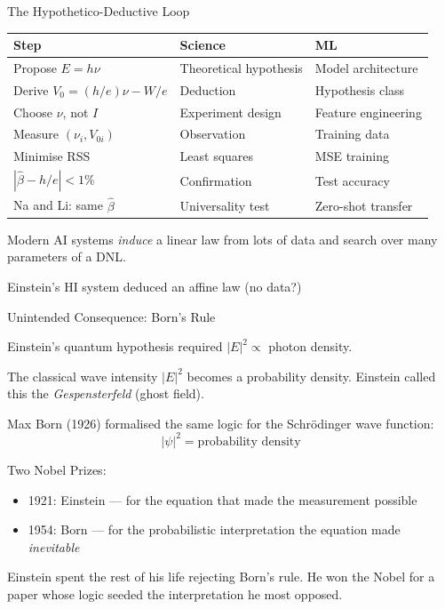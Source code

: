 \documentclass[aspectratio=169]{beamer}
\begin{document}
\begin{frame}{The Hypothetico-Deductive Loop}

\begin{center}
\small
\begin{tabular}{p{4.0cm}p{4.0cm}p{4.0cm}}
\toprule
\textbf{Step} & \textbf{Science} & \textbf{ML} \\
\midrule
Propose $E = h\nu$              & Theoretical hypothesis & Model architecture \\
Derive $V_0 = (h/e)\nu - W/e$   & Deduction              & Hypothesis class \\
Choose $\nu$, not $I$           & Experiment design      & Feature engineering \\
Measure $(\nu_i, V_{0i})$       & Observation            & Training data \\
Minimise RSS                    & Least squares          & MSE training \\
$|\hat\beta - h/e| < 1\%$       & Confirmation           & Test accuracy \\
Na and Li: same $\hat\beta$     & Universality test      & Zero-shot transfer \\
\bottomrule
\end{tabular}
\end{center}

\bigskip
Modern AI systems  \emph{induce} a linear law from lots of data and
search over many parameters of a DNL.

Einstein's HI system  deduced  an affine law (no data?)

\end{frame}

\begin{frame}{Unintended Consequence: Born's Rule}

Einstein's quantum hypothesis required $|E|^2 \propto$ photon density.

The classical wave intensity $|E|^2$ becomes a probability density.
Einstein called this the \emph{Gespensterfeld} (ghost field).

\medskip
Max Born (1926) formalised the same logic for the Schr\"odinger wave
function:
\[
  \boxed{|\psi|^2 = \text{probability density}}
\]

\medskip
Two Nobel Prizes:
\begin{itemize}
  \item 1921: Einstein --- for the equation that made the measurement
    possible
  \item 1954: Born --- for the probabilistic interpretation the equation
    made \emph{inevitable}
\end{itemize}

\medskip
Einstein spent the rest of his life rejecting Born's rule. He won the
Nobel for a paper whose logic seeded the interpretation he most opposed.

\end{frame}
\end{document}
